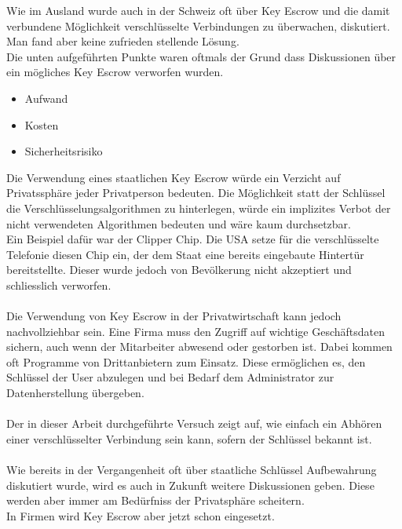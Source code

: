 Wie im Ausland wurde auch in der Schweiz oft über Key Escrow und die damit verbundene Möglichkeit verschlüsselte Verbindungen zu überwachen, diskutiert. Man fand aber keine zufrieden stellende Lösung.\\
	Die unten aufgeführten Punkte waren oftmals der Grund dass Diskussionen über ein mögliches Key Escrow verworfen wurden.
	\begin{itemize}
		\item Aufwand
		\item Kosten
		\item Sicherheitsrisiko
	\end{itemize}
	
\noindent	Die Verwendung eines staatlichen Key Escrow würde ein Verzicht auf Privatssphäre jeder Privatperson bedeuten. Die Möglichkeit statt der Schlüssel die Verschlüsselungsalgorithmen zu hinterlegen, würde ein implizites Verbot der nicht verwendeten Algorithmen bedeuten und wäre kaum durchsetzbar.\\
	Ein Beispiel dafür war der Clipper Chip. Die USA setze für die verschlüsselte Telefonie diesen Chip ein, der dem Staat eine bereits eingebaute Hintertür bereitstellte. Dieser wurde jedoch von Bevölkerung nicht akzeptiert und schliesslich verworfen.\\
	\\
	Die Verwendung von Key Escrow in der Privatwirtschaft kann jedoch nachvollziehbar sein. Eine Firma muss den Zugriff auf wichtige Geschäftsdaten sichern, auch wenn der Mitarbeiter abwesend oder gestorben ist.
	Dabei kommen oft Programme von Drittanbietern zum Einsatz. Diese ermöglichen es, den Schlüssel der User abzulegen und bei Bedarf dem Administrator zur Datenherstellung übergeben.\\
	\\
	Der in dieser Arbeit durchgeführte Versuch zeigt auf, wie einfach ein Abhören einer verschlüsselter Verbindung sein kann, sofern der Schlüssel bekannt ist.\\
	\\
	Wie bereits in der Vergangenheit oft über staatliche Schlüssel Aufbewahrung diskutiert wurde, wird es auch in Zukunft weitere Diskussionen geben. Diese werden aber immer am Bedürfniss der Privatsphäre scheitern.\\
	In Firmen wird Key Escrow aber jetzt schon eingesetzt.